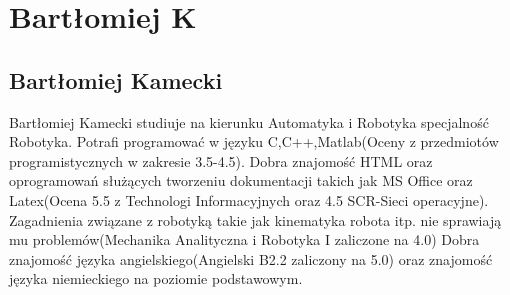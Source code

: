\section{Bartłomiej K}
\subsection{Bartłomiej Kamecki}
Bartłomiej Kamecki studiuje na kierunku Automatyka i Robotyka specjalność Robotyka. Potrafi programować w języku C,C++,Matlab(Oceny z przedmiotów programistycznych w zakresie 3.5-4.5). Dobra znajomość HTML oraz oprogramowań służących tworzeniu dokumentacji takich jak MS Office oraz Latex(Ocena 5.5 z Technologi Informacyjnych oraz 4.5 SCR-Sieci operacyjne). Zagadnienia związane z robotyką takie jak kinematyka robota itp. nie sprawiają mu problemów(Mechanika Analityczna i Robotyka I zaliczone na 4.0) Dobra znajomość języka angielskiego(Angielski B2.2 zaliczony na 5.0) oraz znajomość języka niemieckiego na poziomie podstawowym. 
